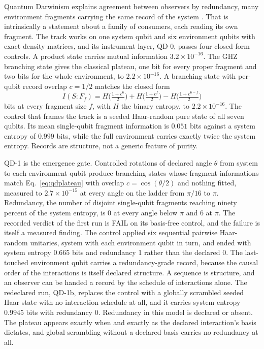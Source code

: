 \documentclass[aps,pre,reprint,nofootinbib,floatfix]{revtex4-2}
\begin{document}
Quantum Darwinism explains agreement between observers by
redundancy, many environment fragments carrying the same record of
the system \cite{Zurek2003, Zurek2009}.  That is intrinsically a
statement about a family of consumers, each reading its own
fragment.  The track works on one system qubit and six environment
qubits with exact density matrices, and its instrument layer, QD-0,
passes four closed-form controls.  A product state carries mutual
information $3.2\times10^{-16}$.  The GHZ branching state gives the
classical plateau, one bit for every proper fragment and two bits
for the whole environment, to $2.2\times10^{-16}$.  A branching
state with per-qubit record overlap $c = 1/2$ matches the closed
form
\begin{equation}
  I(S{:}F_f) = H\!\Big(\tfrac{1+c^{6}}{2}\Big)
   + H\!\Big(\tfrac{1+c^{f}}{2}\Big)
   - H\!\Big(\tfrac{1+c^{6-f}}{2}\Big)
  \label{eq:qdplateau}
\end{equation}
bits at every fragment size $f$, with $H$ the binary entropy,
to $2.2\times10^{-16}$.  The control that frames the track is a
seeded Haar-random pure state of all seven qubits.  Its mean
single-qubit fragment information is $0.051$ bits against a system
entropy of $0.999$ bits, while the full environment carries exactly
twice the system entropy.  Records are structure, not a generic
feature of purity.

QD-1 is the emergence gate.  Controlled rotations of declared angle
$\theta$ from system to each environment qubit produce branching
states whose fragment informations match Eq.~\eqref{eq:qdplateau}
with overlap $c = \cos(\theta/2)$ and nothing fitted, measured to
$2.7\times10^{-15}$ at every angle on the ladder from $\pi/16$ to
$\pi$.  Redundancy, the number of disjoint single-qubit fragments
reaching ninety percent of the system entropy, is 0 at every angle
below $\pi$ and 6 at $\pi$.  The recorded verdict of the first run
is FAIL on its basis-free control, and the failure is itself a
measured finding.  The control applied six sequential pairwise
Haar-random unitaries, system with each environment qubit in turn,
and ended with system entropy $0.665$ bits and redundancy 1 rather
than the declared 0.  The last-touched environment qubit carries a
redundancy-grade record, because the causal order of the
interactions is itself declared structure.  A sequence is
structure, and an observer can be handed a record by the schedule
of interactions alone.  The redeclared run, QD-1b, replaces the
control with a globally scrambled seeded Haar state with no
interaction schedule at all, and it carries system entropy
$0.9945$ bits with redundancy 0.  Redundancy in this model is
declared or absent.  The plateau appears exactly when and exactly
as the declared interaction's basis dictates, and global
scrambling without a declared basis carries no redundancy at
all.
\end{document}
